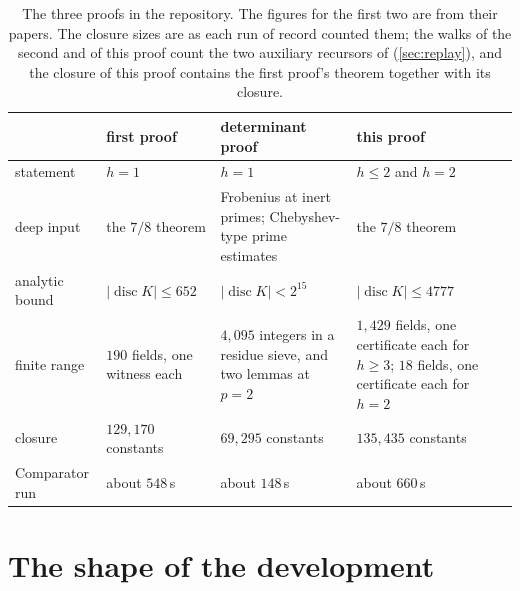 \documentclass[11pt]{article}
\theoremstyle{definition}
\newcommand{\disc}{\operatorname{disc}}
\begin{document}
{\begin{table}[h]
\centering\small
\begin{tabular}{>{\raggedright\arraybackslash}p{3.2cm}>{\raggedright\arraybackslash}p{3.6cm}>{\raggedright\arraybackslash}p{3.6cm}>{\raggedright\arraybackslash}p{3.6cm}}
\toprule
 & first proof \cite{CN1paper} & determinant proof \cite{DETpaper} & this proof\\
\midrule
statement & $h = 1$ & $h = 1$ & $h \le 2$ and $h = 2$\\
deep input & the $7/8$ theorem & Frobenius at inert primes; Chebyshev-type prime estimates & the $7/8$ theorem\\
analytic bound & $|\disc K| \le 652$ & $|\disc K| < 2^{15}$ & $|\disc K| \le 4777$\\
finite range & $190$ fields, one witness each & $4{,}095$ integers in a residue sieve, and two lemmas at $p = 2$ & $1{,}429$ fields, one certificate each for $h \ge 3$; $18$ fields, one certificate each for $h = 2$\\
closure & $129{,}170$ constants & $69{,}295$ constants & $135{,}435$ constants\\
Comparator run & about $548$\,s & about $148$\,s & about $660$\,s\\
\bottomrule
\end{tabular}
\caption[The three proofs in the repository.]{The three proofs in the repository. The figures for the first two are from their papers. The closure sizes are as each run of record counted them; the walks of the second and of this proof count the two auxiliary recursors of  (\cref{sec:replay}), and the closure of this proof contains the first proof's theorem together with its closure.}
\label{tab:compare}
\end{table}

\section{The shape of the development}\label{sec:shape}

}
\end{document}
